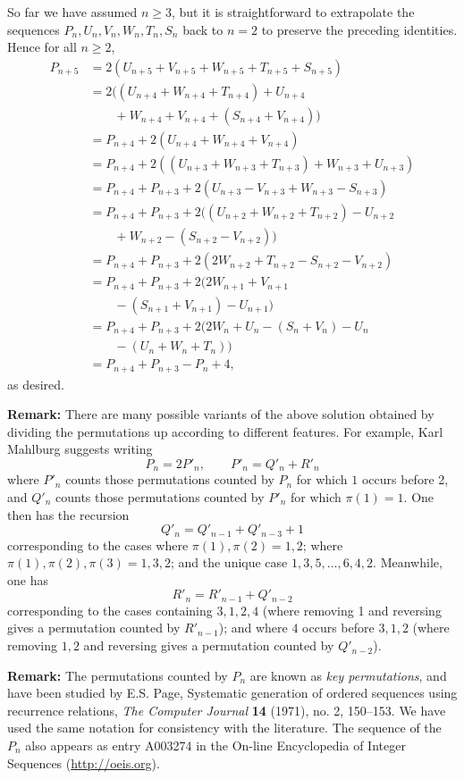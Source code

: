 \documentclass[amssymb,twocolumn,pra,10pt,aps]{revtex4-1}
\begin{document}
\begin{itemize}
So far we have assumed $n \geq 3$, but it is straightforward to extrapolate the sequences $P_n,U_n,V_n,W_n,T_n,S_n$ back to $n=2$ to preserve the preceding identities. Hence for all $n \geq 2$,
\begin{align*}
P_{n+5} &= 2(U_{n+5}+V_{n+5}+W_{n+5}+T_{n+5}+S_{n+5}) \\
&= 2((U_{n+4}+W_{n+4}+T_{n+4})+U_{n+4}\\
& \qquad + W_{n+4}+V_{n+4}+(S_{n+4}+V_{n+4})) \\
&= P_{n+4} + 2(U_{n+4}+W_{n+4}+V_{n+4}) \\
&= P_{n+4} + 2((U_{n+3}+W_{n+3}+T_{n+3})+W_{n+3}+U_{n+3}) \\
&= P_{n+4} + P_{n+3} + 2(U_{n+3}-V_{n+3}+W_{n+3}-S_{n+3}) \\
&= P_{n+4} + P_{n+3} + 2((U_{n+2}+W_{n+2}+T_{n+2})-U_{n+2}\\
&\qquad +W_{n+2}-(S_{n+2}-V_{n+2})) \\
&= P_{n+4} + P_{n+3} + 2(2W_{n+2}+T_{n+2}-S_{n+2}-V_{n+2}) \\
&= P_{n+4} + P_{n+3} + 2(2W_{n+1}+V_{n+1}\\
&\qquad -(S_{n+1}+V_{n+1})-U_{n+1}) \\
&= P_{n+4} + P_{n+3} + 2(2W_n+U_n-(S_n+V_n)-U_n\\
&\qquad -(U_n+W_n+T_n)) \\
&= P_{n+4} + P_{n+3} - P_n + 4,
\end{align*}
as desired.

\noindent
\textbf{Remark:}
There are many possible variants of the above solution obtained by dividing the permutations up according to different features. For example, Karl Mahlburg suggests 
writing 
\[
P_n = 2P'_n, \qquad P'_n = Q'_n + R'_n
\]
where $P'_n$ counts those permutations counted by $P_n$ for which $1$ occurs before 2,
and $Q'_n$ counts those permutations counted by $P'_n$ for which $\pi(1) = 1$. One then has the recursion
\[
Q'_n = Q'_{n-1} + Q'_{n-3} + 1
\]
corresponding to the cases where $\pi(1), \pi(2) = 1,2$; where $\pi(1), \pi(2), \pi(3) = 1,3,2$;  and the unique case $1,3,5,\dots,6,4,2$. Meanwhile, one has
\[
R'_n = R'_{n-1} + Q'_{n-2}
\]
corresponding to the cases containing $3,1,2,4$ (where removing 1 and reversing gives a permutation counted by $R'_{n-1}$); and where $4$ occurs before $3, 1, 2$ (where removing $1,2$ and reversing gives a permutation counted by $Q'_{n-2}$).

\noindent
\textbf{Remark:}
The permutations counted by $P_n$ are known as {\it key permutations}, and have been studied by E.S. Page, Systematic generation of ordered sequences using recurrence relations, {\it The Computer Journal} {\bf 14} (1971), no. 2, 150--153.  We have used the same notation for consistency with the literature. The sequence of the $P_n$ also appears as entry A003274 in the On-line Encyclopedia of Integer Sequences (\url{http://oeis.org}).


\end{itemize}
\end{document}
